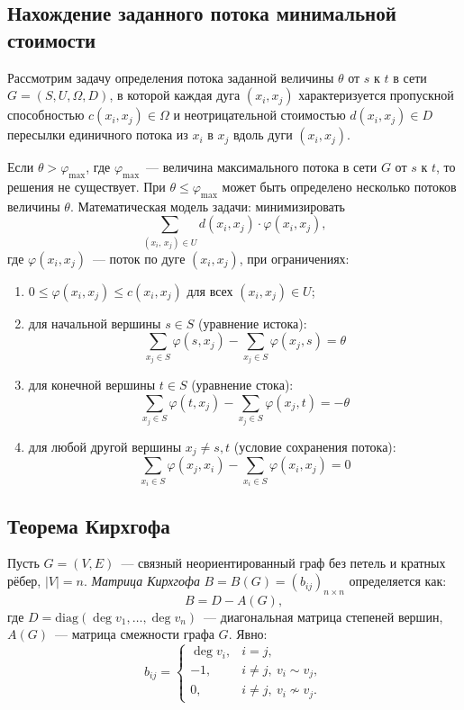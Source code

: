 \subsection{Нахождение заданного потока минимальной стоимости}
Рассмотрим задачу определения потока заданной величины $\theta$ от $s$ к
$t$ в сети $G = (S, U, \Omega, D)$, в которой каждая дуга $(x_i, x_j)$
характеризуется пропускной способностью $c(x_i, x_j) \in \Omega$ и
неотрицательной стоимостью $d(x_i, x_j) \in D$ пересылки единичного
потока из $x_i$ в $x_j$ вдоль дуги $(x_i, x_j)$.

Если $\theta > \varphi_{\max}$, где $\varphi_{\max}$~--- величина
максимального потока в сети $G$ от $s$ к $t$, то решения не существует.
При $\theta \leqslant \varphi_{\max}$ может быть определено несколько
потоков величины $\theta$. Математическая модель задачи: минимизировать
\[
    \sum_{(x_i,\, x_j) \in U} d(x_i, x_j) \cdot \varphi(x_i, x_j),
\]
где $\varphi(x_i, x_j)$~--- поток по дуге $(x_i, x_j)$, при ограничениях:

\begin{enumerate}
    \item $0 \leqslant \varphi(x_i, x_j) \leqslant c(x_i, x_j)$
          для всех $(x_i, x_j) \in U$;
    \item для начальной вершины $s \in S$ (уравнение истока):
          \[
              \sum_{x_j \in S} \varphi(s, x_j) -
              \sum_{x_j \in S} \varphi(x_j, s) = \theta
          \]
    \item для конечной вершины $t \in S$ (уравнение стока):
          \[
              \sum_{x_j \in S} \varphi(t, x_j) -
              \sum_{x_j \in S} \varphi(x_j, t) = -\theta
          \]
    \item для любой другой вершины $x_j \neq s, t$ (условие сохранения потока):
          \[
              \sum_{x_i \in S} \varphi(x_j, x_i) -
              \sum_{x_i \in S} \varphi(x_i, x_j) = 0
          \]
\end{enumerate}

\subsection{Теорема Кирхгофа}

Пусть $G = (V, E)$~--- связный неориентированный граф без петель и кратных
рёбер, $|V| = n$. \textit{Матрица Кирхгофа} $B = B(G) = (b_{ij})_{n \times n}$ определяется как:
\[
    B = D - A(G),
\]
где $D = \mathrm{diag}(\deg v_1, \ldots, \deg v_n)$~--- диагональная матрица
степеней вершин, $A(G)$~--- матрица смежности графа $G$. Явно:
\[
    b_{ij} =
    \begin{cases}
        \deg v_i, & i = j, \\
        -1,       & i \neq j,\ v_i \sim v_j, \\
        0,        & i \neq j,\ v_i \not\sim v_j.
    \end{cases}
\]

